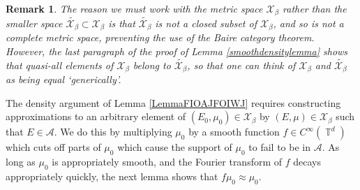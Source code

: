 \documentclass[dvipsnames,letterpaper,12pt]{article}
\numberwithin{equation}{section}
\DeclareMathOperator{\TT}{\mathbb{T}}
\newtheorem{remark}[theorem]{Remark}
\numberwithin{theorem}{section}
\begin{document}
\begin{remark}
    The reason we must work with the metric space $\mathcal{X}_\beta$ rather than the smaller space $\tilde{\mathcal{X}_\beta} \subset \mathcal{X}_\beta$ is that $\tilde{\mathcal{X}_\beta}$ is not a closed subset of $\mathcal{X}_\beta$, and so is not a complete metric space, preventing the use of the Baire category theorem. However, the last paragraph of the proof of Lemma \ref{smoothdensitylemma} shows that quasi-all elements of $\mathcal{X}_\beta$ belong to $\tilde{\mathcal{X}_\beta}$, so that one can think of $\mathcal{X}_\beta$ and $\tilde{\mathcal{X}_\beta}$ as being equal `generically'.
\end{remark}

The density argument of Lemma \ref{LemmaFIOAJFOIWJ} requires constructing approximations to an arbitrary element of $(E_0,\mu_0) \in \mathcal{X}_\beta$ by $(E,\mu) \in \mathcal{X}_\beta$ such that $E \in \mathcal{A}$. We do this by multiplying $\mu_0$ by a smooth function $f \in C^\infty(\TT^d)$ which cuts off parts of $\mu_0$ which cause the support of $\mu_0$ to fail to be in $\mathcal{A}$. As long as $\mu_0$ is appropriately smooth, and the Fourier transform of $f$ decays appropriately quickly, the next lemma shows that $f \mu_0 \approx \mu_0$.
\end{document}

